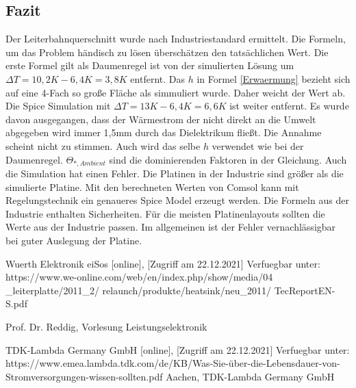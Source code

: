 \documentclass[10pt,a4paper,oneside,abstracton]{scrartcl}
\begin{document}
\begin{multicols}{2}
\section{Fazit}
Der Leiterbahnquerschnitt wurde nach Industriestandard ermittelt. 
Die Formeln, um das Problem händisch zu lösen überschätzen den tatsächlichen Wert. 
\newline
Die erste Formel gilt als Daumenregel ist von der simulierten Lösung um $\Delta T = 10,2K - 6,4K = 3,8K$ entfernt. \newline
Das $h $ in Formel \ref*{Erwaermung} bezieht sich auf eine 4-Fach so große Fläche als simmuliert wurde. Daher weicht der Wert ab. \newline
Die Spice Simulation mit $\Delta T = 13K - 6,4K = 6,6 K$ ist weiter entfernt.  \newline
Es wurde davon ausgegangen, dass der Wärmestrom der nicht direkt an die Umwelt abgegeben wird \newline
immer 1,5mm durch das Dielektrikum fließt. Die Annahme scheint nicht zu stimmen. Auch wird das selbe  $h $ verwendet wie bei der Daumenregel. \newline
$ \Theta_{*, Ambient} $ sind die dominierenden Faktoren in der Gleichung.  \newline
Auch die Simulation hat einen Fehler. 
Die Platinen in der Industrie sind größer als die simulierte Platine.
Mit den berechneten Werten von Comsol kann mit Regelungstechnik ein genaueres Spice Model erzeugt werden.  \newline
Die Formeln aus der Industrie enthalten Sicherheiten.
\newline
Für die meisten Platinenlayouts sollten die Werte aus der Industrie passen. 
Im allgemeinen ist der Fehler vernachlässigbar bei guter Auslegung der Platine. 
\noindent
\begin{thebibliography}{9}

Wuerth Elektronik eiSos  [online], [Zugriff am 22.12.2021] Verfuegbar unter:
 https://www.we-online.com/web/en/index.php/show/media/04
 \_leiterplatte/2011\_2/ relaunch/produkte/heatsink/neu\_2011/
 TecReport\-EN-S.pdf

Prof. Dr. Reddig, Vorlesung Leistungselektronik

TDK-Lambda Germany GmbH [online], [Zugriff am 22.12.2021] Verfuegbar unter:	https://www.emea.lambda.tdk.com/de/KB/Was-Sie-über-die-Lebensdauer-von-Stromversorgungen-wissen-sollten.pdf
Aachen, TDK-Lambda Germany GmbH




\end{thebibliography}
\end{multicols}
\end{document}
